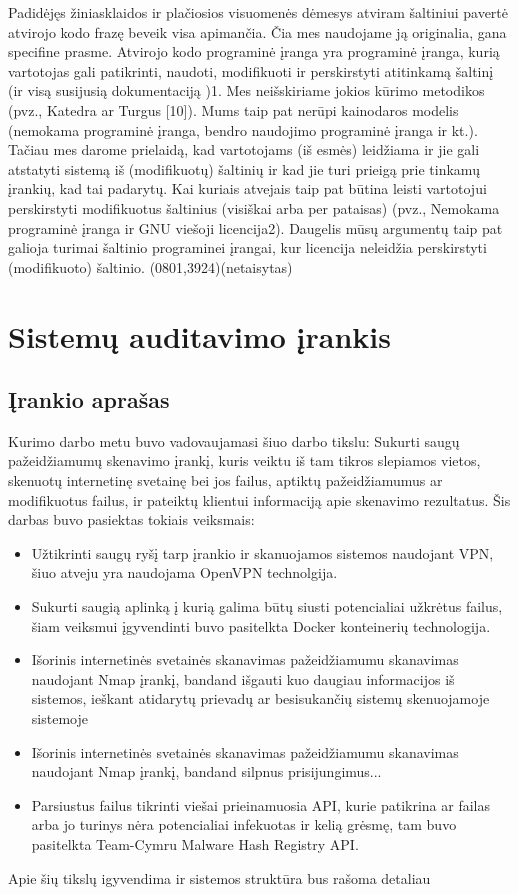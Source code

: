 \documentclass[a4paper,12pt,fleqn]{article}
\begin{document}
Padidėjęs žiniasklaidos ir plačiosios visuomenės dėmesys atviram šaltiniui pavertė atvirojo kodo frazę beveik visa apimančia. Čia mes naudojame ją originalia, gana specifine prasme. Atvirojo kodo programinė įranga yra programinė įranga, kurią vartotojas gali patikrinti, naudoti, modifikuoti ir perskirstyti atitinkamą šaltinį (ir visą susijusią dokumentaciją )1. Mes neišskiriame jokios kūrimo metodikos (pvz., Katedra ar Turgus [10]). Mums taip pat nerūpi kainodaros modelis (nemokama programinė įranga, bendro naudojimo programinė įranga ir kt.). Tačiau mes darome prielaidą, kad vartotojams (iš esmės) leidžiama ir jie gali atstatyti sistemą iš (modifikuotų) šaltinių ir kad jie turi prieigą prie tinkamų įrankių, kad tai padarytų. Kai kuriais atvejais taip pat būtina leisti vartotojui perskirstyti modifikuotus šaltinius (visiškai arba per pataisas) (pvz., Nemokama programinė įranga ir GNU viešoji licencija2). Daugelis mūsų argumentų taip pat galioja turimai šaltinio programinei įrangai, kur licencija neleidžia perskirstyti (modifikuoto) šaltinio. (0801,3924)(netaisytas)


\newpage
\section{Sistemų auditavimo įrankis}
\label{sec:motivation}

\subsection{Įrankio aprašas}
\label{sec:example}

Kurimo darbo metu buvo vadovaujamasi šiuo darbo tikslu: Sukurti saugų pažeidžiamumų skenavimo įrankį, kuris veiktu iš tam tikros slepiamos vietos, skenuotų internetinę
svetainę bei jos failus, aptiktų pažeidžiamumus ar modifikuotus failus, ir pateiktų klientui informaciją apie skenavimo rezultatus. Šis darbas buvo pasiektas tokiais veiksmais:
\begin{itemize}
	\item Užtikrinti saugų ryšį tarp įrankio ir skanuojamos sistemos naudojant VPN, šiuo atveju yra naudojama OpenVPN technolgija.
	\item Sukurti saugią aplinką į kurią galima būtų siusti potencialiai užkrėtus failus, šiam veiksmui įgyvendinti buvo pasitelkta Docker konteinerių technologija.
	\item Išorinis internetinės svetainės skanavimas pažeidžiamumu skanavimas naudojant Nmap įrankį, bandand išgauti kuo daugiau informacijos iš sistemos, ieškant atidarytų prievadų ar besisukančių sistemų skenuojamoje sistemoje
	\item Išorinis internetinės svetainės skanavimas pažeidžiamumu skanavimas naudojant Nmap įrankį, bandand silpnus prisijungimus...
	\item Parsiustus failus tikrinti viešai prieinamuosia API, kurie patikrina ar failas arba jo turinys nėra potencialiai infekuotas ir kelią grėsmę, tam buvo pasitelkta Team-Cymru Malware Hash Registry API.
\end{itemize}
Apie šių tikslų igyvendima ir sistemos struktūra bus rašoma detaliau
\end{document}
